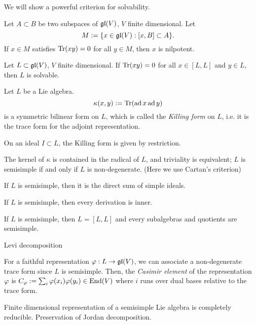 \documentclass{../../large}
\begin{document}
\begin{prb}
We will show a powerful criterion for solvability.
\begin{parts}
\item Let $A\subset B$ be two subspaces of $\mathfrak{gl}(V)$, $V$ finite dimensional. Let
\[M:=\{x\in\mathfrak{gl}(V):[x,B]\subset A\}.\]
If $x\in M$ satisfies $\operatorname{Tr}(xy)=0$ for all $y\in M$, then $x$ is nilpotent.
\item Let $L\subset\mathfrak{gl}(V)$, $V$ finite dimensional. If $\operatorname{Tr}(xy)=0$ for all $x\in[L,L]$ and $y\in L$, then $L$ is solvable.
\end{parts}
\end{prb}

\begin{prb}
Let $L$ be a Lie algebra.
\[\kappa(x,y):=\operatorname{Tr}(\operatorname{ad} x\operatorname{ad} y)\]
is a symmetric bilinear form on $L$, which is called the \emph{Killing form} on $L$, i.e. it is the trace form for the adjoint representation.
\begin{parts}
\item On an ideal $I\subset L$, the Killing form is given by restriction.
\item The kernel of $\kappa$ is contained in the radical of $L$, and triviality is equivalent; $L$ is semisimple if and only if $L$ is non-degenerate. (Here we use Cartan's criterion)
\item If $L$ is semisimple, then it is the direct sum of simple ideals.
\item If $L$ is semisimple, then every derivation is inner.
\item If $L$ is semisimple, then $L=[L,L]$ and every subalgebras and quotients are semisimple.
\end{parts}
\end{prb}

Levi decomposition


\begin{prb}
For a faithful representation $\varphi:L\to\mathfrak{gl}(V)$, we can associate a non-degenerate trace form since $L$ is semisimple.
Then, the \emph{Casimir element} of the representation $\varphi$ is $C_\varphi:=\sum_i\varphi(x_i)\varphi(y_i)\in\operatorname{End}(V)$ where $i$ runs over dual bases relative to the trace form.
\end{prb}

\begin{prb}
Finite dimensional representation of a semisimple Lie algebra is completely reducible.
Preservation of Jordan decomposition.
\end{prb}
\end{document}
